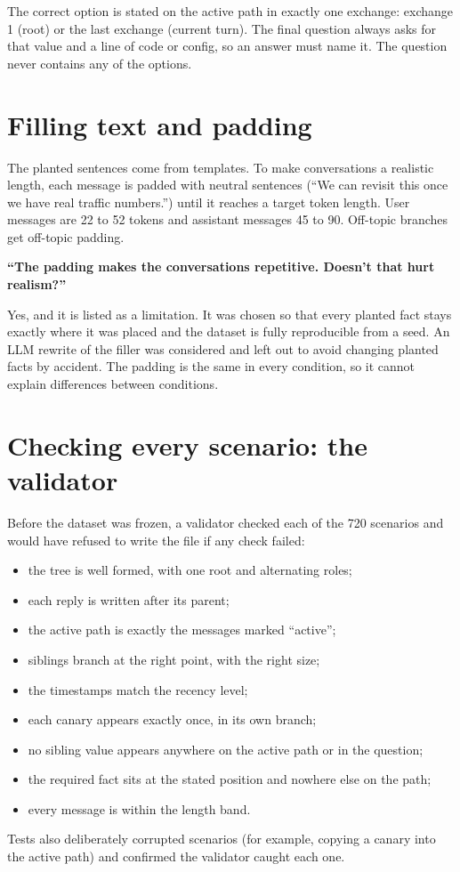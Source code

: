 The correct option is stated on the active path in exactly one exchange: exchange 1 (root) or the last exchange (current turn). The final question always asks for that value and a line of code or config, so an answer must name it. The question never contains any of the options.

\section{Filling text and padding}

The planted sentences come from templates. To make conversations a realistic length, each message is padded with neutral sentences (``We can revisit this once we have real traffic numbers.'') until it reaches a target token length. User messages are 22 to 52 tokens and assistant messages 45 to 90. Off-topic branches get off-topic padding.

\begin{ask}
\textbf{``The padding makes the conversations repetitive. Doesn't that hurt realism?''}\par
Yes, and it is listed as a limitation. It was chosen so that every planted fact stays exactly where it was placed and the dataset is fully reproducible from a seed. An LLM rewrite of the filler was considered and left out to avoid changing planted facts by accident. The padding is the same in every condition, so it cannot explain differences between conditions.
\end{ask}

\section{Checking every scenario: the validator}

Before the dataset was frozen, a validator checked each of the 720 scenarios and would have refused to write the file if any check failed:
\begin{itemize}
\item the tree is well formed, with one root and alternating roles;
\item each reply is written after its parent;
\item the active path is exactly the messages marked ``active'';
\item siblings branch at the right point, with the right size;
\item the timestamps match the recency level;
\item each canary appears exactly once, in its own branch;
\item no sibling value appears anywhere on the active path or in the question;
\item the required fact sits at the stated position and nowhere else on the path;
\item every message is within the length band.
\end{itemize}
Tests also deliberately corrupted scenarios (for example, copying a canary into the active path) and confirmed the validator caught each one.

